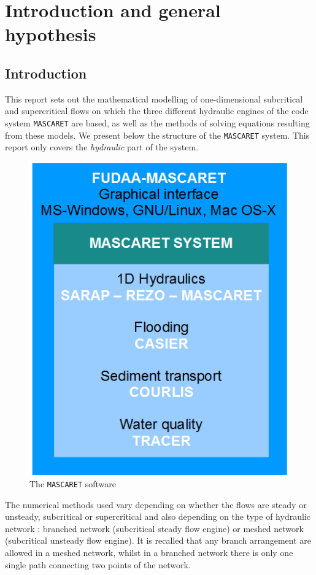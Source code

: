 \section{Introduction and general hypothesis}

\subsection{Introduction}

This report sets out the mathematical modelling of one-dimensional subcritical and supercritical flows on which the three different hydraulic engines of the code system \texttt{MASCARET} are based, as well as the methods of solving equations resulting from these models.
We present below the structure of the \texttt{MASCARET} system. This report only covers the \textit{hydraulic} part of the system.

\begin{figure}[h]
 \begin{center}
  \includegraphics[scale=1.5]{Figures/MASCARET_system.eps}
  \caption{The \texttt{MASCARET} software}
 \end{center}
\end{figure}

The numerical methods used vary depending on whether the flows are steady or unsteady, subcritical or supercritical and also depending on the type of hydraulic network : branched network (subcritical steady flow engine) or meshed network (subcritical unsteady flow engine). It is recalled that any branch arrangement are allowed in a meshed network, whilst in a branched network there is only one single path connecting two points of the network.

